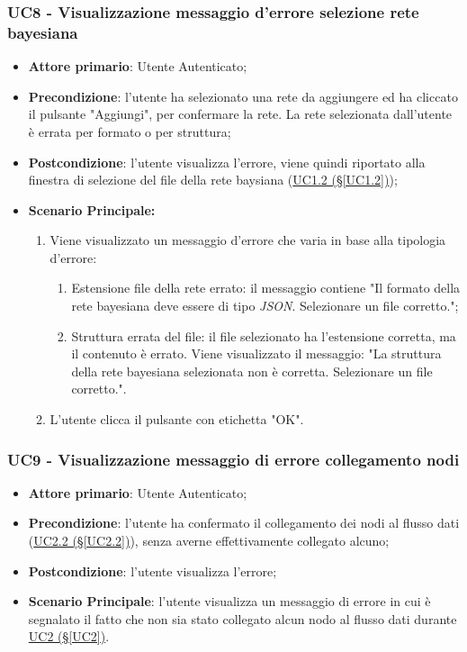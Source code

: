 \subsubsection{UC8 - Visualizzazione messaggio d'errore selezione  rete bayesiana}\label{UC8}
\begin{itemize}
\item \textbf{Attore primario}: Utente Autenticato;
\item \textbf{Precondizione}: l'utente ha selezionato una rete da aggiungere ed ha cliccato il pulsante "Aggiungi", per confermare la rete. La rete selezionata dall'utente è errata per formato o per struttura;
\item \textbf{Postcondizione}: l'utente visualizza l'errore, viene quindi riportato alla finestra di selezione del file della rete baysiana (\hyperref[UC1.2]{UC1.2 (§\ref*{UC1.2})});
\item \textbf{Scenario Principale:} 
	\begin{enumerate}
		\item Viene visualizzato un messaggio d'errore che varia in base alla tipologia d'errore:
			\begin{enumerate}
				\item Estensione file della rete errato: il messaggio contiene "Il formato della rete bayesiana deve essere di tipo \textit{JSON}. Selezionare un file corretto.";
				\item Struttura errata del file: il file selezionato ha l'estensione corretta, ma il contenuto è errato. Viene visualizzato il messaggio: "La struttura della rete bayesiana selezionata non è corretta. Selezionare un file corretto.".
			\end{enumerate}
		\item L'utente clicca il pulsante con etichetta "OK".
	\end{enumerate}
\end{itemize}

\pagebreak

\subsubsection{UC9 - Visualizzazione messaggio di errore collegamento nodi}\label{UC9}
\begin{itemize}
\item \textbf{Attore primario}: Utente Autenticato;
\item \textbf{Precondizione}: l'utente ha confermato il collegamento dei nodi al flusso dati (\hyperref[UC2.2]{UC2.2 (§\ref*{UC2.2})}), senza averne effettivamente collegato alcuno;
\item \textbf{Postcondizione}: l'utente visualizza l'errore;
\item \textbf{Scenario Principale}: l'utente visualizza un messaggio di errore in cui è segnalato il fatto che non sia stato collegato alcun nodo al flusso dati durante \hyperref[UC2]{UC2 (§\ref*{UC2})}.
\end{itemize}

